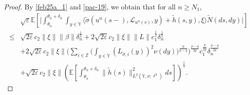 \documentclass[11pt]{article}
\numberwithin{equation}{section}
\theoremstyle{plain}
\begin{document}
\begin{proof}
 By \eqref{feb25a_1} and \eqref{pac-19}, we obtain that for all $n \ge N_1$, 
 \begin{align} \label{pac-20}  
       & \sqrt{\varepsilon} 
           \mathbb{E} 
                  \left[ 
                          \Big| \int_{\theta_n}^{\theta_n + \delta_n} 
                               \int_{y \in \mathbb{Y} }
                                   \langle
                                          \widetilde{\sigma}(u^n(s-), \mathcal{L}_{u^n(s)}, y) 
                                          +  \widetilde{h}(s, y), 
                                          \xi 
                                  \rangle
                           \widetilde{N}(ds, dy) 
                       \Big| 
                   \right]  \nonumber\\   
  \le & \sqrt{2 \varepsilon} c_2 \| \xi \| 
                \| \beta \| \delta_n^{\frac{1}{2} }
           + 2 \sqrt{2 \varepsilon} c_2 \| \xi \| \|L\|
                        c_1^{\frac{1}{2} }
                              \delta_n^{\frac{1}{2} }  \nonumber\\                
       & + 2 \sqrt{2 \varepsilon} c_2 \| \xi \| 
                  \bigg( \sum_{i \in \mathbb{Z} }
                                   \Big( \int_{y \in \mathbb{Y} }
                                                 \left( L_{ \widetilde{\sigma}, i}(y) \right)^2 \nu(dy)
                                   \Big)^{\frac{p}{p-q} }
                  \bigg)^{\frac{p-q}{2p} }
                      c_1^{\frac{q}{2p} }
                       \delta_n^{\frac{p-q}{2p} }  \nonumber\\      
       & + \sqrt{2 \varepsilon} c_2 \| \xi \|
                  \left( \mathbb{E} 
                                 \left[ \int_{\theta_n}^{\theta_n + \delta_n} 
                                                   \| \widetilde{h}(s) \|_{L^2(\mathbb{Y}, \nu; \ell^2) }^2        
                                            ds
                                 \right]
                  \right)^{\frac{1}{2} }. 
 \end{align} 
 

\end{proof}
\end{document}
